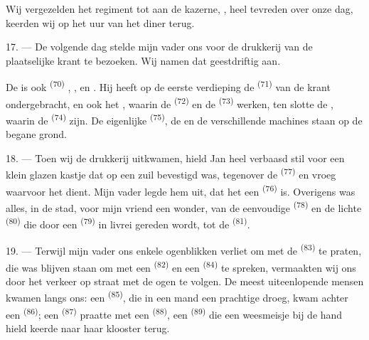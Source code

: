Wij vergezelden het regiment tot aan de kazerne, , heel tevreden over onze dag,
keerden wij op het uur van het diner terug.

\VUsaut{3.0mm}

17. --- De volgende dag stelde mijn vader ons voor de drukkerij van de plaatselijke krant te
bezoeken. Wij namen dat geestdriftig aan.

De  is ook  \textsuperscript{(70)}
, ,  en
. Hij heeft op de eerste verdieping de 
\textsuperscript{(71)} van de krant ondergebracht, en ook het
, waarin de  \textsuperscript{(72)} en
de  \textsuperscript{(73)} werken, ten slotte de
, waarin de  \textsuperscript{(74)}
zijn. De eigenlijke  \textsuperscript{(75)}, de
 en de verschillende machines staan op de begane grond.

\VUsaut{3.0mm}

18. --- Toen wij de drukkerij uitkwamen, hield Jan heel verbaasd stil voor een klein glazen
kastje dat op een zuil bevestigd was, tegenover de
 \textsuperscript{(77)} en vroeg waarvoor het dient. Mijn
vader legde hem uit, dat het een  \textsuperscript{(76)} is. Overigens was
alles, in de stad, voor mijn vriend een wonder, van de eenvoudige
 \textsuperscript{(78)} en de lichte
 \textsuperscript{(80)} die door een
 \textsuperscript{(79)} in livrei gereden wordt, tot de
 \textsuperscript{(81)}.

19. --- Terwijl mijn vader ons enkele ogenblikken verliet om met de
 \textsuperscript{(83)} te praten, die was blijven
staan om met een  \textsuperscript{(82)} en een
 \textsuperscript{(84)} te spreken, vermaakten wij ons door het
verkeer op straat met de ogen te volgen. De meest uiteenlopende mensen kwamen langs ons: een
 \textsuperscript{(85)}, die in een mand een prachtige
 droeg, kwam achter een
 \textsuperscript{(86)}; een 
\textsuperscript{(87)} praatte met een  \textsuperscript{(88)}, een
 \textsuperscript{(89)} die een weesmeisje bij de hand hield keerde naar haar
klooster terug.

